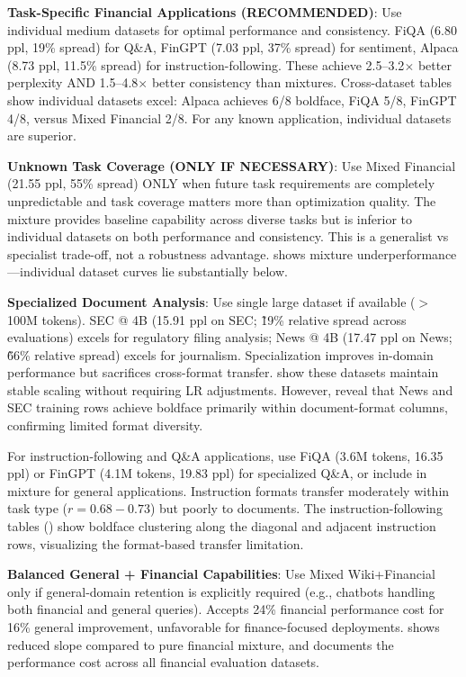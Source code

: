 \textbf{Task-Specific Financial Applications (RECOMMENDED)}: Use individual medium datasets for optimal performance and consistency. FiQA (6.80 ppl, 19\% spread) for Q\&A, FinGPT (7.03 ppl, 37\% spread) for sentiment, Alpaca (8.73 ppl, 11.5\% spread) for instruction-following. These achieve 2.5–3.2$\times$ better perplexity AND 1.5–4.8$\times$ better consistency than mixtures. Cross-dataset tables show individual datasets excel: Alpaca achieves 6/8 boldface, FiQA 5/8, FinGPT 4/8, versus Mixed Financial 2/8. For any known application, individual datasets are superior.

\textbf{Unknown Task Coverage (ONLY IF NECESSARY)}: Use Mixed Financial (21.55 ppl, 55\% spread) ONLY when future task requirements are completely unpredictable and task coverage matters more than optimization quality. The mixture provides baseline capability across diverse tasks but is inferior to individual datasets on both performance and consistency. This is a generalist vs specialist trade-off, not a robustness advantage.  shows mixture underperformance—individual dataset curves lie substantially below.

\textbf{Specialized Document Analysis}: Use single large dataset if available ($>$ 100M tokens). SEC @ 4B (15.91 ppl on SEC; \~19\% relative spread across evaluations) excels for regulatory filing analysis; News @ 4B (17.47 ppl on News; \~66\% relative spread) excels for journalism. Specialization improves in-domain performance but sacrifices cross-format transfer.  show these datasets maintain stable scaling without requiring LR adjustments. However,  reveal that News and SEC training rows achieve boldface primarily within document-format columns, confirming limited format diversity.

For instruction-following and Q\&A applications, use FiQA (3.6M tokens, 16.35 ppl) or FinGPT (4.1M tokens, 19.83 ppl) for specialized Q\&A, or include in mixture for general applications. Instruction formats transfer moderately within task type ($r = 0.68-0.73$) but poorly to documents. The instruction-following tables () show boldface clustering along the diagonal and adjacent instruction rows, visualizing the format-based transfer limitation.

\textbf{Balanced General + Financial Capabilities}: Use Mixed Wiki+Financial only if general-domain retention is explicitly required (e.g., chatbots handling both financial and general queries). Accepts 24\% financial performance cost for 16\% general improvement, unfavorable for finance-focused deployments.  shows reduced slope compared to pure financial mixture, and  documents the performance cost across all financial evaluation datasets.

